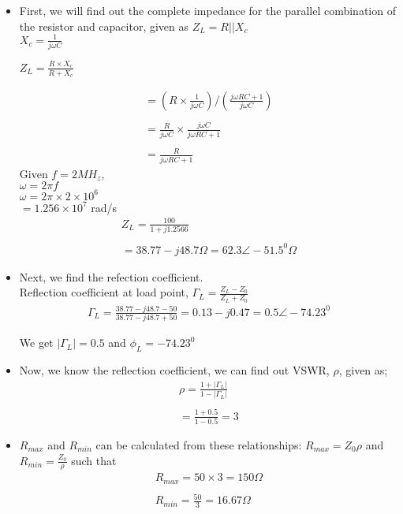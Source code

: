 \begin{itemize}
	\item First, we will find out the complete impedance for the parallel combination of the resistor and capacitor, given as $Z_{L}=R||X_c$\\
	$X_c =\frac{1}{j\omega C}$
	\begin{center}
		$Z_L=\frac{R \times X_c}{R + X_c}$

	\end{center}
	\begin{align*}
	=(R\times\frac{1}{j\omega C})/(\frac{j\omega RC + 1}{j\omega C})\\\\
	=\frac{R}{j\omega C} \times \frac{j \omega C}{j\omega RC + 1}\\\\
	=\frac{R}{j\omega RC + 1}
	\end{align*}
	Given $f=2MH_{z}$,\\
	$\omega = 2\pi f$\\
	$\omega= 2\pi \times 2 \times 10^{6}$\\
	$=1.256\times 10^{7}$ rad/s
    \begin{align*}
    	Z_{L}=\frac{100}{1 + j1.2566}\\\\
     = 38.77-j48.7\Omega = 62.3\angle-51.5^{0}\Omega
    \end{align*}
    
    \item Next, we find the refection coefficient.\\
	Reflection coefficient at load point, $\Gamma_{L}=\frac{Z_{L}-Z_{0}}{Z_{L}+Z_{0}}$
	\begin{align*}
	\Gamma_{L} = \frac{38.77-j48.7-50}{38.77-j48.7+50}
	=0.13-j0.47 = 0.5\angle-74.23^0
	\end{align*}
	
	We get $|\Gamma_{L}|=0.5$ and $\phi_L = -74.23^0$
	
	\item Now, we know the reflection coefficient, we can find out VSWR, $\rho$, given as;
    \begin{align*}
    	\rho=\frac{1 + |\Gamma_{L}|}{1-|\Gamma_{L}|}\\\\
    	=\frac{1+0.5}{1-0.5} = 3
    \end{align*}
     
     \item $R_{max}$ and $R_{min}$ can be calculated from these relationships:
     $R_{max} = Z_0\rho$ and $R_{min} = \frac{Z_0}{\rho}$ such that
     \begin{align*}
     R_{max} = 50 \times 3 = 150\Omega\\\\
     R_{min} = \frac{50}{3} = 16.67\Omega
     \end{align*}
\end{itemize}

